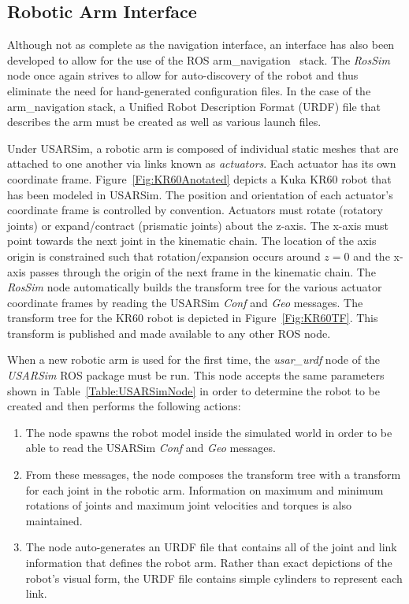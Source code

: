 \subsection*{Robotic Arm Interface}
Although not as complete as the navigation interface, an interface has also been developed to allow for the use of the ROS arm\_navigation~\cite{RosArmNavWeb} stack. The {\it RosSim} node once again strives to allow for auto-discovery of the robot and thus eliminate the need for hand-generated configuration files. In the case of the arm\_navigation stack, a Unified Robot Description Format (URDF) file that describes the arm must be created as well as various launch files. 

Under USARSim, a robotic arm is composed of individual static meshes that are attached to one another via  links known as {\it actuators}. Each actuator has its own coordinate frame. Figure~\ref{Fig:KR60Anotated} depicts a Kuka KR60 robot that has been modeled in USARSim. The position and orientation of each actuator's coordinate frame is controlled by convention. Actuators must rotate (rotatory joints) or expand/contract (prismatic joints) about the z-axis. The x-axis must point towards the next joint in the kinematic chain. The location of the axis origin is constrained such that rotation/expansion occurs around $z=0$ and the x-axis passes through the origin of the next frame in the kinematic chain. The {\it RosSim} node automatically builds the transform tree for the various actuator coordinate frames by reading the USARSim {\it Conf} and {\it Geo} messages. The transform tree for the KR60 robot is depicted in Figure~\ref{Fig:KR60TF}. This transform is published and made available to any other ROS node.

When a new robotic arm is used for the first time, the {\it usar\_urdf} node of the {\it USARSim} ROS package must be run. This node accepts the same parameters shown in Table~\ref{Table:USARSimNode} in order to determine the robot to be created and then performs the following actions:
\begin{enumerate}
\item The node spawns the robot model inside the simulated world in order to be able to read the USARSim  {\it Conf} and {\it Geo} messages.
\item From these messages, the node composes the transform tree with a transform for each joint in the robotic arm. Information on maximum and minimum rotations of joints and maximum joint velocities and torques is also maintained.
\item The node auto-generates an URDF file that contains all of the joint and link information that defines the robot arm. Rather than exact depictions of the robot's visual form, the URDF file contains simple cylinders to represent each link.
\end{enumerate}

